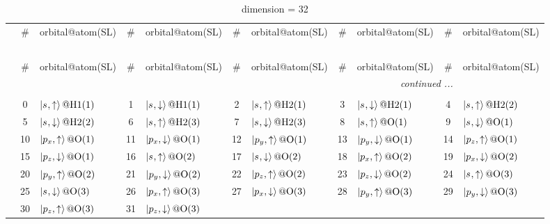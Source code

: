 \documentclass[fleqn,10pt,landscape]{jsarticle}
\begin{document}
\renewcommand{\arraystretch}{1.6}
\begin{longtable}[l]{c|cl|cl|cl|cl|cl}
\captionsetup{justification=raggedright, singlelinecheck=off}
\caption{dimension = 32}
 \\
 \hline \hline
 & \# & orbital@atom(SL) & \# & orbital@atom(SL) & \# & orbital@atom(SL) & \# & orbital@atom(SL) & \# & orbital@atom(SL) \\ \hline \endfirsthead

\multicolumn{10}{l}{\tablename\ \thetable{}} \\
 \hline \hline
 & \# & orbital@atom(SL) & \# & orbital@atom(SL) & \# & orbital@atom(SL) & \# & orbital@atom(SL) & \# & orbital@atom(SL) \\ \hline \endhead

 \hline \hline
\multicolumn{10}{r}{\footnotesize\it continued ...} \\ \endfoot

 \hline \hline
\multicolumn{10}{r}{} \\ \endlastfoot

 & 0 & $\ket{s_{},\uparrow}@{\rm H1}(1)$ & 1 & $\ket{s_{},\downarrow}@{\rm H1}(1)$ & 2 & $\ket{s_{},\uparrow}@{\rm H2}(1)$ & 3 & $\ket{s_{},\downarrow}@{\rm H2}(1)$ & 4 & $\ket{s_{},\uparrow}@{\rm H2}(2)$ \\
& 5 & $\ket{s_{},\downarrow}@{\rm H2}(2)$ & 6 & $\ket{s_{},\uparrow}@{\rm H2}(3)$ & 7 & $\ket{s_{},\downarrow}@{\rm H2}(3)$ & 8 & $\ket{s_{},\uparrow}@{\rm O}(1)$ & 9 & $\ket{s_{},\downarrow}@{\rm O}(1)$ \\
& 10 & $\ket{p_{x},\uparrow}@{\rm O}(1)$ & 11 & $\ket{p_{x},\downarrow}@{\rm O}(1)$ & 12 & $\ket{p_{y},\uparrow}@{\rm O}(1)$ & 13 & $\ket{p_{y},\downarrow}@{\rm O}(1)$ & 14 & $\ket{p_{z},\uparrow}@{\rm O}(1)$ \\
& 15 & $\ket{p_{z},\downarrow}@{\rm O}(1)$ & 16 & $\ket{s_{},\uparrow}@{\rm O}(2)$ & 17 & $\ket{s_{},\downarrow}@{\rm O}(2)$ & 18 & $\ket{p_{x},\uparrow}@{\rm O}(2)$ & 19 & $\ket{p_{x},\downarrow}@{\rm O}(2)$ \\
& 20 & $\ket{p_{y},\uparrow}@{\rm O}(2)$ & 21 & $\ket{p_{y},\downarrow}@{\rm O}(2)$ & 22 & $\ket{p_{z},\uparrow}@{\rm O}(2)$ & 23 & $\ket{p_{z},\downarrow}@{\rm O}(2)$ & 24 & $\ket{s_{},\uparrow}@{\rm O}(3)$ \\
& 25 & $\ket{s_{},\downarrow}@{\rm O}(3)$ & 26 & $\ket{p_{x},\uparrow}@{\rm O}(3)$ & 27 & $\ket{p_{x},\downarrow}@{\rm O}(3)$ & 28 & $\ket{p_{y},\uparrow}@{\rm O}(3)$ & 29 & $\ket{p_{y},\downarrow}@{\rm O}(3)$ \\
& 30 & $\ket{p_{z},\uparrow}@{\rm O}(3)$ & 31 & $\ket{p_{z},\downarrow}@{\rm O}(3)$ &  &  &  &  &  &  \\
\end{longtable}
\end{document}
